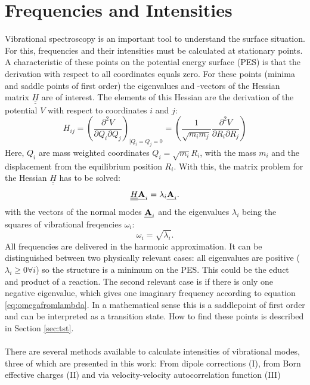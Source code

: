 \documentclass[11pt,DIV=13,BCOR=5mm,a4paper,headinclude]{scrbook}
\def\mathbi#1{\textbf{\em #1}}
\renewcommand{\vec}[1]{\mathbi{#1}}
\def\doubleunderline#1{\underline{\underline{#1}}}
\begin{document}
\section{Frequencies and Intensities}
Vibrational spectroscopy is an important tool to understand the surface situation.
For this, frequencies and their intensities must be calculated at stationary points.
A characteristic of these points on the potential energy surface (PES) is that the derivation with respect to all coordinates equals zero.
For these points (minima and saddle points of first order) the eigenvalues and -vectors of the Hessian matrix $\doubleunderline{H}$ are of interest.
The elements of this Hessian are the derivation of the potential $V$ with respect to coordinates $i$ and $j$:
\begin{equation}
 H_{ij}=\left( \frac{\partial^2 V}{\partial Q_i \partial Q_j} \right)_{|Q_i=Q_j=0}=\left(\frac{1}{\sqrt{m_i m_j}} \frac{\partial^2 V}{\partial R_i \partial R_j} \right)
\end{equation}
Here, $Q_i$ are mass weighted coordinates $Q_i=\sqrt{m_i}R_i$, with the mass $m_i$ and the displacement from the equilibrium position $R_i$.
With this, the matrix problem for the Hessian $\doubleunderline{H}$ has to be solved:
\begin{equation}
 \doubleunderline{H} \vec{A}_i=\lambda_i\vec{A}_i.
\end{equation}
with the vectors of the normal modes $\vec{A}_i$ and the eigenvalues $\lambda_i$ being the squares of vibrational freqencies $\omega_i$: 
\begin{equation}\label{eq:omegafromlambda}
 \omega_i=\sqrt{\lambda_i}.
\end{equation}
All frequencies are delivered in the harmonic approximation.
It can be distinguished between two physically relevant cases: all eigenvalues are positive ($\lambda_i\geq 0 \forall i$) so the structure is a minimum on the PES.
This could be the educt and product of a reaction.
The second relevant case is if there is only one negative eigenvalue, which gives one imaginary frequency according to equation \ref{eq:omegafromlambda}.
In a mathematical sense this is a saddlepoint of first order and can be interpreted as a transition state.
How to find these points is described in Section \ref{sec:tst}.
\\\\
There are several methods available to calculate intensities of vibrational modes, three of which are presented in this work: From dipole corrections (I), from Born effective charges (II) and via velocity-velocity autocorrelation function (III)
\end{document}
